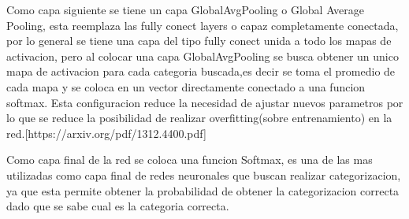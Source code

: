 Como capa siguiente se tiene un capa GlobalAvgPooling o Global Average Pooling, esta reemplaza las fully conect layers o capaz completamente 
conectada, por lo general se tiene una capa del tipo fully conect unida a todo los mapas de activacion, pero al colocar una capa GlobalAvgPooling
se busca obtener un unico mapa de activacion para cada categoria buscada,es decir se toma el promedio de cada mapa y se coloca en un vector directamente 
conectado a una funcion softmax. Esta configuracion reduce la necesidad de ajustar nuevos parametros por lo que se reduce la posibilidad de 
realizar overfitting(sobre entrenamiento) en la red.[https://arxiv.org/pdf/1312.4400.pdf]

Como capa final de la red se coloca una funcion Softmax, es una de las mas utilizadas como capa final de redes neuronales que buscan realizar
categorizacion, ya que esta permite obtener la probabilidad de obtener la categorizacion correcta dado que se sabe cual es la categoria correcta.
 
